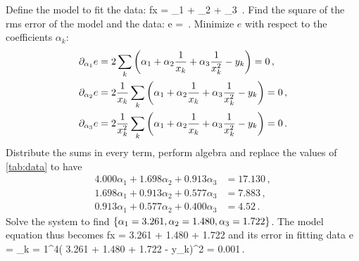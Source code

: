 Define the model to fit the data:
\beq
    f\vat x = \alpha_1 + \alpha_2  + \alpha_3 \,.
\eeq
%
Find the square of the rms error of the model and the data:
%
\beq
    e = \,.    
\eeq
%
Minimize $e$ with respect to the coefficients $\alpha_k$:
%
\begin{align*}
%
\ipd{\alpha_1} e &= 2\ssum{k}{\left(\alpha_1 + \alpha_2\dfrac{1}{x_k} + \alpha_3\dfrac{1}{x_k^2} - y_k\right)} = 0\,,\\
%
\ipd{\alpha_2} e &= 2\dfrac{1}{x_k}\ssum{k}{\left(\alpha_1 + \alpha_2\dfrac{1}{x_k} 
                    + \alpha_3\dfrac{1}{x_k^2} - y_k\right)} = 0\,,\\
%
\ipd{\alpha_3} e &= 2\dfrac{1}{x^2_k}\ssum{k}{\left(\alpha_1 + \alpha_2\dfrac{1}{x_k} 
                    + \alpha_3\dfrac{1}{x_k^2} - y_k\right)} = 0\,.
%
\end{align*}
%
Distribute the sums in every term, perform algebra and replace the values of \cref{tab:data} to have
%
\begin{align*}
    4.000\alpha_1 + 1.698\alpha_2 + 0.913\alpha_3 &= 17.130\,,\\
    1.698\alpha_1 + 0.913\alpha_2 + 0.577\alpha_3 &= 7.883\,,\\
    0.913\alpha_1 + 0.577\alpha_2 + 0.400\alpha_3 &= 4.52\,.
\end{align*}
%
Solve the system to find $\left\lbrace{\alpha_1 = 3.261, \alpha_2 = 1.480, \alpha_3 = 1.722}\right\rbrace$. The model equation thus becomes
%
\beq
    f\vat x = 3.261 + 1.480 + 1.722
\eeq
%
and its error in fitting data
%
\beq
    e = \sum_{k = 1}^4\left( 3.261 + 1.480 + 1.722 - y_k\right)^2 
      = 0.001\,. \mqed
\eeq

